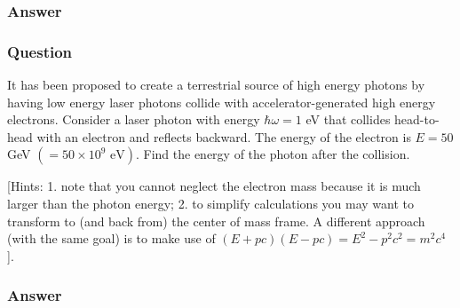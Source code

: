\subsubsection{Answer}


\subsubsection{Question}
It has been proposed to create a terrestrial source of high energy photons by having low energy laser photons collide with accelerator-generated high energy electrons. Consider a laser photon with energy $\hbar\omega = 1$ eV that collides head-to-head with an electron and reflects backward. The energy of the electron is $E = 50$ GeV $(= 50 {\times} 10^9 \text{ eV})$. Find the energy of the photon after the collision.

[Hints: 1. note that you cannot neglect the electron mass because it is much larger than the photon energy; 2. to simplify calculations you may want to transform to (and back from) the center of mass frame. A different approach (with the same goal) is to make use of $(E + pc)(E - pc) = E^2 - p^2 c^2 = m^2 c^4$ ].
\subsubsection{Answer}























